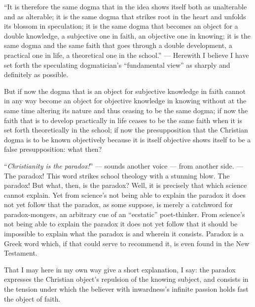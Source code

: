 \documentclass[12pt,a4paper]{book}
\begin{document}
``It is therefore the same dogma that in the idea shows itself both as unalterable and as
alterable; it is the same dogma that strikes root in the heart and unfolds its blossom in
speculation; it is the same dogma that becomes an object for a double knowledge, a subjective one
in faith, an objective one in knowing; it is the same dogma and the same faith that goes through a
double development, a practical one in life, a theoretical one in the school.'' --- Herewith I
believe I have set forth the speculating dogmatician's ``fundamental view'' as sharply and
definitely as possible.

But if now the dogma that is an object for subjective knowledge in faith cannot in any way become
an object for objective knowledge in knowing without at the same time altering its nature and thus
ceasing to be the same dogma; if now the faith that is to develop practically in life ceases to be
the same faith when it is set forth theoretically in the school; if now the presupposition that
the Christian dogma
is to be known objectively because it is itself objective shows itself to be a false
presupposition: what then?

``\emph{Christianity is the paradox!}'' --- sounds another voice --- from another side. --- The
paradox! This word strikes school theology with a stunning blow. The paradox! But what, then, is
the paradox? Well, it is precisely that which science cannot explain. Yet from science's not being
able to explain the paradox it does not yet follow that the paradox, as some suppose, is merely a
catchword for paradox-mongers, an arbitrary cue of an ``ecstatic'' poet-thinker. From science's not
being able to explain the paradox it does not yet follow that it should be impossible to explain
what the paradox is and wherein it consists. Paradox is a Greek word which, if that could serve
to recommend it, is even found in the New Testament.

That I may here in my own way give a short explanation, I say: the paradox expresses the Christian
object's repulsion of the knowing subject, and consists in the tension under which the believer
with inwardness's infinite passion holds fast the object of faith.
\end{document}
